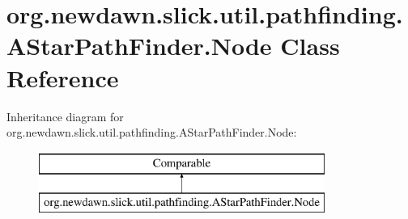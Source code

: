 \hypertarget{classorg_1_1newdawn_1_1slick_1_1util_1_1pathfinding_1_1_a_star_path_finder_1_1_node}{}\section{org.\+newdawn.\+slick.\+util.\+pathfinding.\+A\+Star\+Path\+Finder.\+Node Class Reference}
\label{classorg_1_1newdawn_1_1slick_1_1util_1_1pathfinding_1_1_a_star_path_finder_1_1_node}
Inheritance diagram for org.\+newdawn.\+slick.\+util.\+pathfinding.\+A\+Star\+Path\+Finder.\+Node\+:\begin{figure}[H]
\begin{center}
\leavevmode
\includegraphics[height=2.000000cm]{classorg_1_1newdawn_1_1slick_1_1util_1_1pathfinding_1_1_a_star_path_finder_1_1_node}
\end{center}
\end{figure}
